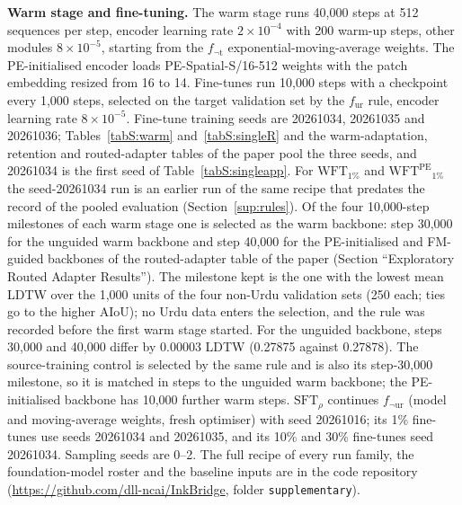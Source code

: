 \documentclass[10pt,a4paper]{article}
\newcommand{\fur}{f_{\mathrm{ur}}}
\newcommand{\fnot}[1]{f_{\neg\mathrm{#1}}}
\newcommand{\WFT}[1]{\mathrm{WFT}_{#1}}
\newcommand{\WFTpe}[1]{\mathrm{WFT}^{\mathrm{PE}}{}_{#1}}
\newcommand{\SFT}[1]{\mathrm{SFT}_{#1}}
\begin{document}
\textbf{Warm stage and fine-tuning.} The warm stage runs 40,000 steps at 512 sequences per step, encoder learning rate $2\times10^{-4}$ with 200 warm-up steps, other modules $8\times10^{-5}$, starting from the $\fnot{t}$ exponential-moving-average weights. The PE-initialised encoder loads PE-Spatial-S/16-512 weights with the patch embedding resized from 16 to 14. Fine-tunes run 10,000 steps with a checkpoint every 1,000 steps, selected on the target validation set by the $\fur$ rule, encoder learning rate $8\times10^{-5}$. Fine-tune training seeds are 20261034, 20261035 and 20261036; Tables~\ref{tabS:warm} and~\ref{tabS:singleR} and the warm-adaptation, retention and routed-adapter tables of the paper pool the three seeds, and 20261034 is the first seed of Table~\ref{tabS:singleapp}. For $\WFT{1\%}$ and $\WFTpe{1\%}$ the seed-20261034 run is an earlier run of the same recipe that predates the record of the pooled evaluation (Section~\ref{sup:rules}). Of the four 10,000-step milestones of each warm stage one is selected as the warm backbone: step 30,000 for the unguided warm backbone and step 40,000 for the PE-initialised and FM-guided backbones of the routed-adapter table of the paper (Section ``Exploratory Routed Adapter Results''). The milestone kept is the one with the lowest mean LDTW over the 1,000 units of the four non-Urdu validation sets (250 each; ties go to the higher AIoU); no Urdu data enters the selection, and the rule was recorded before the first warm stage started. For the unguided backbone, steps 30,000 and 40,000 differ by 0.00003 LDTW (0.27875 against 0.27878). The source-training control is selected by the same rule and is also its step-30,000 milestone, so it is matched in steps to the unguided warm backbone; the PE-initialised backbone has 10,000 further warm steps. $\SFT{\rho}$ continues $\fnot{ur}$ (model and moving-average weights, fresh optimiser) with seed 20261016; its 1\% fine-tunes use seeds 20261034 and 20261035, and its 10\% and 30\% fine-tunes seed 20261034. Sampling seeds are 0--2. The full recipe of every run family, the foundation-model roster and the baseline inputs are in the code repository (\url{https://github.com/dll-ncai/InkBridge}, folder \texttt{supplementary}).
\end{document}
